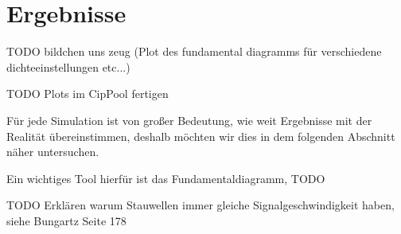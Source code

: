\chapter{Ergebnisse}
TODO bildchen uns zeug (Plot des fundamental diagramms für
verschiedene dichteeinstellungen etc...)

TODO Plots im CipPool fertigen 

Für jede Simulation ist von großer Bedeutung, wie weit Ergebnisse mit der Realität übereinstimmen, deshalb möchten wir dies in dem folgenden Abschnitt näher untersuchen. 

Ein wichtiges Tool hierfür ist das Fundamentaldiagramm, TODO

TODO Erklären warum Stauwellen immer gleiche Signalgeschwindigkeit haben, siehe Bungartz Seite 178

